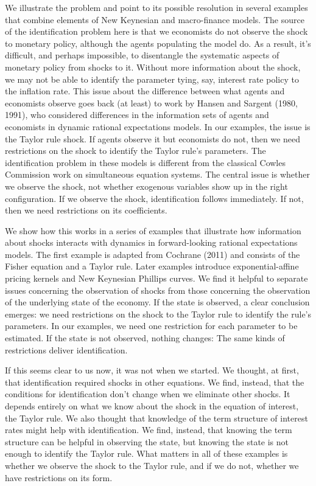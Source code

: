 \documentclass[11pt]{article}
\newcounter{fig}
\begin{document}
{We illustrate the problem and point to its possible resolution in several
examples that combine elements of New Keynesian and macro-finance models.
The source of the identification problem here is that we economists do not
observe the shock to monetary policy, although the agents populating the model do.
As a result, it's difficult, and perhaps impossible,
to disentangle the systematic aspects of monetary policy from shocks to it.
Without more information about the shock,
we may not be able to identify the parameter tying, say,
interest rate policy to the inflation rate.
%
This issue about the difference between what agents and economists observe
goes back (at least) to work by Hansen and Sargent (1980, 1991),
who considered differences in the information sets of agents
and economists in dynamic rational expectations models.
In our examples, the issue is the Taylor rule shock.
If agents observe it but economists do not,
then we need restrictions on the shock to identify
the Taylor rule's parameters.
The identification problem in these models is different
from the classical Cowles Commission work on simultaneous equation systems.
The central issue is whether we observe the shock, not whether
exogenous variables show up in the right configuration.
If we observe the shock, identification follows immediately.
If not, then we need restrictions on its coefficients.

We show how this works in a series of examples that illustrate
how information about shocks interacts with dynamics in forward-looking rational expectations
models.
The first example is adapted from Cochrane (2011)
and consists of the Fisher equation and a Taylor rule.
Later examples introduce exponential-affine pricing kernels
and New Keynesian Phillips curves.
We find it helpful to separate issues concerning the observation of shocks
from those concerning the observation of the underlying state of the economy.
If the state is observed, a clear conclusion emerges:
we need restrictions on the shock to the Taylor rule to
identify the rule's parameters.
In our examples, we need one restriction for each parameter to be estimated.
If the state is not observed, nothing changes:  The same kinds of restrictions
deliver identification.

If this seems clear to us now, it was not when we started.
We thought, at first, that identification required shocks in other equations.
We find, instead, that the conditions for identification don't change
when we eliminate other shocks. %
It depends entirely on what we know about the shock in the equation of interest,
the Taylor rule.
We also thought that knowledge of the term structure of interest rates
might help with identification.
We find, instead, that knowing the term structure can be helpful
in observing the state, but knowing the state is not enough to identify the Taylor rule.
What matters in all of these examples is whether we observe the shock to the Taylor rule,
and if we do not, whether we have restrictions on its form.

}
\end{document}
